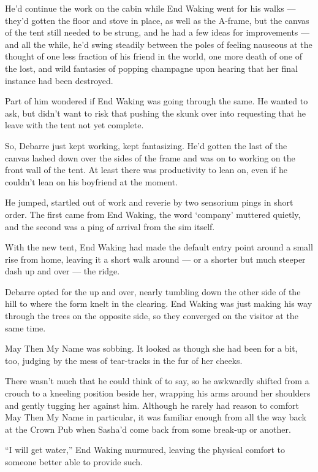 He'd continue the work on the cabin while End Waking went for his walks — they'd gotten the floor and stove in place, as well as the A-frame, but the canvas of the tent still needed to be strung, and he had a few ideas for improvements — and all the while, he'd swing steadily between the poles of feeling nauseous at the thought of one less fraction of his friend in the world, one more death of one of the lost, and wild fantasies of popping champagne upon hearing that her final instance had been destroyed.

Part of him wondered if End Waking was going through the same. He wanted to ask, but didn't want to risk that pushing the skunk over into requesting that he leave with the tent not yet complete.

So, Debarre just kept working, kept fantasizing. He'd gotten the last of the canvas lashed down over the sides of the frame and was on to working on the front wall of the tent. At least there was productivity to lean on, even if he couldn't lean on his boyfriend at the moment.

He jumped, startled out of work and reverie by two sensorium pings in short order. The first came from End Waking, the word `company' muttered quietly, and the second was a ping of arrival from the sim itself.

With the new tent, End Waking had made the default entry point around a small rise from home, leaving it a short walk around — or a shorter but much steeper dash up and over — the ridge.

Debarre opted for the up and over, nearly tumbling down the other side of the hill to where the form knelt in the clearing. End Waking was just making his way through the trees on the opposite side, so they converged on the visitor at the same time.

May Then My Name was sobbing. It looked as though she had been for a bit, too, judging by the mess of tear-tracks in the fur of her cheeks.

There wasn't much that he could think of to say, so he awkwardly shifted from a crouch to a kneeling position beside her, wrapping his arms around her shoulders and gently tugging her against him. Although he rarely had reason to comfort May Then My Name in particular, it was familiar enough from all the way back at the Crown Pub when Sasha'd come back from some break-up or another.

``I will get water,'' End Waking murmured, leaving the physical comfort to someone better able to provide such.

